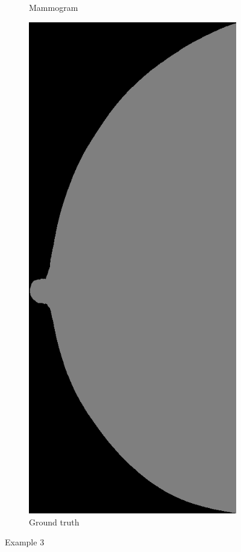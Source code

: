 \begin{figure}[h]
\begin{subfigure}{0.2\textwidth}
         \caption{Mammogram}
	\end{subfigure}
	\quad
	\begin{subfigure}{0.2\textwidth}
		\centering
			\includegraphics[width=\textwidth]{plots/examples/label_3.png}
         \caption{Ground truth}
	\end{subfigure}
	\caption[Example 3]{Example 3}
\end{figure}

